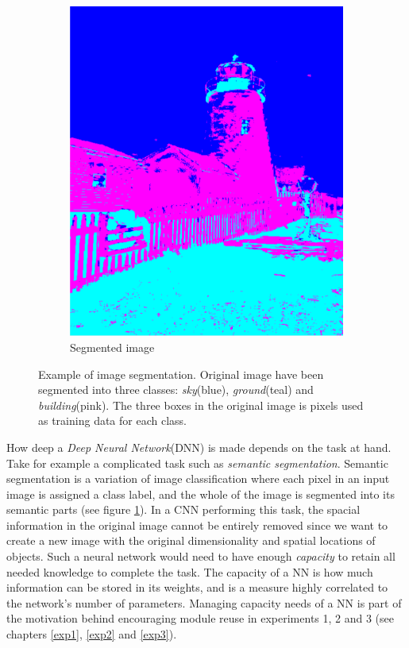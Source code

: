 \begin{figure}
\begin{subfigure}[ht]{0.49\linewidth}
        \includegraphics[width=\linewidth]{Chapters/2.Background/figures/segmentation.png}
        \caption{Segmented image}
    \end{subfigure}
    \caption[Image segmentation]{Example of image segmentation. Original image have been segmented into three classes: \textit{sky}(blue), \textit{ground}(teal) and \textit{building}(pink). The three boxes in the original image is pixels used as training data for each class.}
    \label{fig:semanticsegmentation}
\end{figure}

How deep a \textit{Deep Neural Network}(DNN) is made depends on the task at hand. Take for example a complicated task such as \textit{semantic segmentation}. Semantic segmentation is a variation of image classification where each pixel in an input image is assigned a class label, and the whole of the image is segmented into its semantic parts (see figure \ref{fig:semanticsegmentation}). In a CNN performing this task, the spacial information in the original image cannot be entirely removed since we want to create a new image with the original dimensionality and spatial locations of objects. Such a neural network would need to have enough \textit{capacity} to retain all needed knowledge to complete the task. The capacity of a NN is how much information can be stored in its weights, and is a measure highly correlated to the network's number of parameters. Managing capacity needs of a NN is part of the motivation behind encouraging module reuse in experiments 1, 2 and 3 (see chapters \ref{exp1}, \ref{exp2} and \ref{exp3}).

